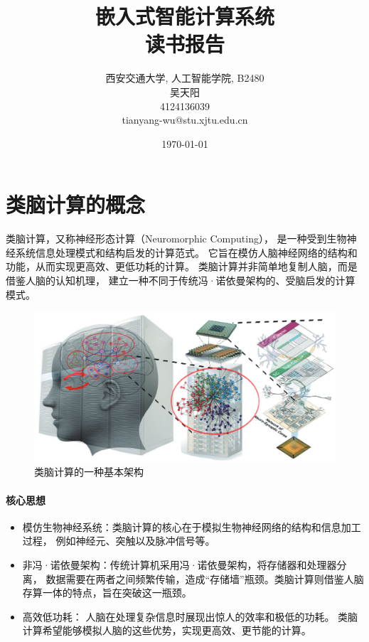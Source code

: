 \documentclass[12pt, a4paper, oneside]{ctexart}
\numberwithin{equation}{section}  %
\begin{document}
\title{嵌入式智能计算系统\\读书报告}
\author{
西安交通大学, 人工智能学院, B2480 \\[10ex]
吴天阳\\[1ex]
4124136039\\[1ex]
tianyang-wu@stu.xjtu.edu.cn\\[2ex]
}
\date{\today}
\maketitle %
\clearpage %
\tableofcontents %

\clearpage
\section{类脑计算的概念}
类脑计算，又称神经形态计算（Neuromorphic Computing），
是一种受到生物神经系统信息处理模式和结构启发的计算范式。
它旨在模仿人脑神经网络的结构和功能，从而实现更高效、更低功耗的计算。
类脑计算并非简单地复制人脑，而是借鉴人脑的认知机理，
建立一种不同于传统冯·诺依曼架构的、受脑启发的计算模式\cite{ref1}。
\begin{figure}[htbp]
    \centering
    \includegraphics[width=\linewidth]{1.png}
    \caption{类脑计算的一种基本架构}
\end{figure}

\paragraph{核心思想}
\begin{itemize}
    \item 模仿生物神经系统：类脑计算的核心在于模拟生物神经网络的结构和信息加工过程，
    例如神经元、突触以及脉冲信号等。
    \item 非冯·诺依曼架构：传统计算机采用冯·诺依曼架构，将存储器和处理器分离，
    数据需要在两者之间频繁传输，造成“存储墙”瓶颈。类脑计算则借鉴人脑存算一体的特点，旨在突破这一瓶颈。
    \item 高效低功耗： 人脑在处理复杂信息时展现出惊人的效率和极低的功耗。
    类脑计算希望能够模拟人脑的这些优势，实现更高效、更节能的计算。
\end{itemize}
\end{document}
